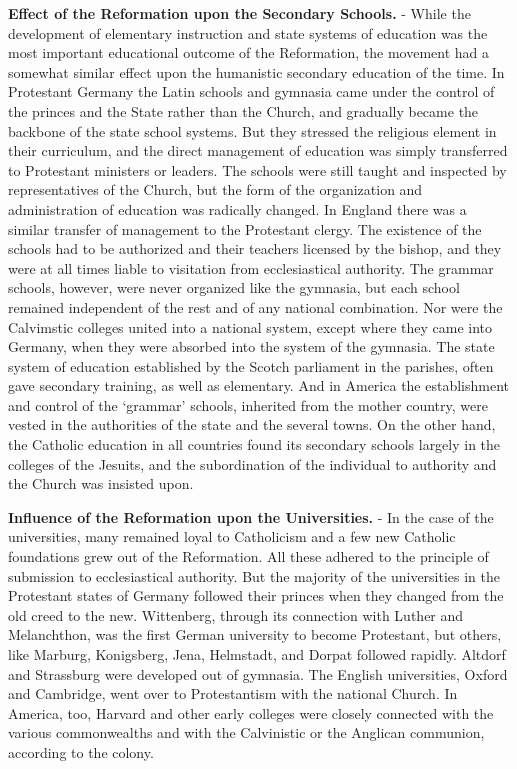 \documentclass[
]{book}
\begin{document}
\textbf{Effect of the Reformation upon the Secondary Schools.} - While the development of elementary instruction and state systems of education was the most important educational outcome of the Reformation, the movement had a somewhat similar effect upon the humanistic secondary education of the time. In Protestant Germany the Latin schools and gymnasia came under the control of the princes and the State rather than the Church, and gradually became the backbone of the state school systems. But they stressed the religious element in their curriculum, and the direct management of education was simply transferred to Protestant ministers or leaders. The schools were still taught and inspected by representatives of the Church, but the form of the organization and administration of education was radically changed. In England there was a similar transfer of management to the Protestant clergy. The existence of the schools had to be authorized and their teachers licensed by the bishop, and they were at all times liable to visitation from ecclesiastical authority. The grammar schools, however, were never organized like the gymnasia, but each school remained independent of the rest and of any national combination. Nor were the Calvimstic colleges united into a national system, except where they came into Germany, when they were absorbed into the system of the gymnasia. The state system of education established by the Scotch parliament in the parishes, often gave secondary training, as well as elementary. And in America the establishment and control of the `grammar' schools, inherited from the mother country, were vested in the authorities of the state and the several towns. On the other hand, the Catholic education in all countries found its secondary schools largely in the colleges of the Jesuits, and the subordination of the individual to authority and the Church was insisted upon.

\textbf{Influence of the Reformation upon the Universities.} - In the case of the universities, many remained loyal to Catholicism and a few new Catholic foundations grew out of the Reformation. All these adhered to the principle of submission to ecclesiastical authority. But the majority of the universities in the Protestant states of Germany followed their princes when they changed from the old creed to the new. Wittenberg, through its connection with Luther and Melanchthon, was the first German university to become Protestant, but others, like Marburg, Konigsberg, Jena, Helmstadt, and Dorpat followed rapidly. Altdorf and Strassburg were developed out of gymnasia. The English universities, Oxford and Cambridge, went over to Protestantism with the national Church. In America, too, Harvard and other early colleges were closely connected with the various commonwealths and with the Calvinistic or the Anglican communion, according to the colony.
\end{document}
